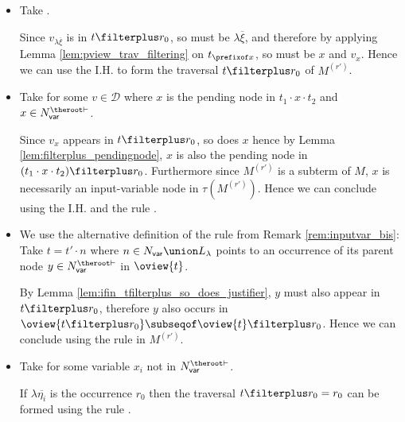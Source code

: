 \begin{itemize}
    \item {} Take .

        Since $v_{\lambda \overline{\xi}}$ is in $t
        \filterplus r_0$, so must be $\lambda \overline{\xi}$, and
        therefore by applying Lemma \ref{lem:pview_trav_filtering}
        on $t_{\prefixof x}$, so must be $x$ and $v_x$. Hence we can
        use the I.H. to form the traversal $t
        \filterplus r_0$ of $M^{(r')}$.


   \item {} Take  for some
    $v \in \mathcal{D}$ where $x$ is the pending node in $t_1 \cdot x \cdot t_2$ and $x \in N_{\sf var}^{\theroot\vdash}$.

    Since $v_x$ appears in $t\filterplus r_0$, so does $x$ hence by Lemma \ref{lem:filterplus_pendingnode}, $x$ is also the pending node in $(t_1 \cdot x \cdot t_2)\filterplus r_0$. Furthermore since $M^{(r')}$ is a subterm of $M$, $x$ is necessarily an input-variable node in $\tau(M^{(r')})$. Hence we can conclude using the I.H. and the rule .


    \item {} We use the alternative definition of the rule from Remark \ref{rem:inputvar_bis}:
    Take $t =  t' \cdot n$ where $n \in N_{\sf var}\union L_\lambda$ points to an occurrence of its parent node $y \in N_{\sf var}^{\theroot\vdash}$ in $\oview{t}$.

    By Lemma \ref{lem:ifin_tfilterplus_so_does_justifier}, $y$ must also appear in $t\filterplus r_0$,
    therefore $y$ also occurs in $\oview{t\filterplus r_0} \subseqof \oview{t}\filterplus r_0$.
    Hence we can conclude using the rule  in $M^{(r')}$.


    \item {}
    Take  for some
        variable $x_i$ not in $N_{\sf var}^{\theroot\vdash}$.

    If $\lambda \overline{\eta_i}$ is the occurrence $r_0$ then
    the traversal $t\filterplus r_0 = r_0$ can be formed using
    the rule .


\end{itemize}
